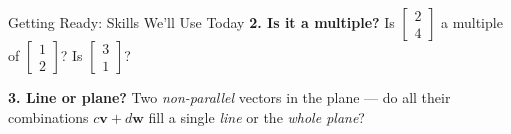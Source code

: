 \documentclass[10pt]{article}
\newcommand{\vv}{\mathbf{v}}
\newcommand{\ww}{\mathbf{w}}
\begin{document}
\begin{notesbox}{Getting Ready: Skills We'll Use Today}
\vspace{8pt}
\textbf{2. Is it a multiple?} Is $\begin{bmatrix} 2 \\ 4 \end{bmatrix}$ a multiple of
$\begin{bmatrix} 1 \\ 2 \end{bmatrix}$? Is $\begin{bmatrix} 3 \\ 1 \end{bmatrix}$?

\vspace{6pt}
\textbf{3. Line or plane?} Two \emph{non-parallel} vectors in the plane --- do all their
combinations $c\vv+d\ww$ fill a single \emph{line} or the \emph{whole plane}?
\end{notesbox}
\end{document}
